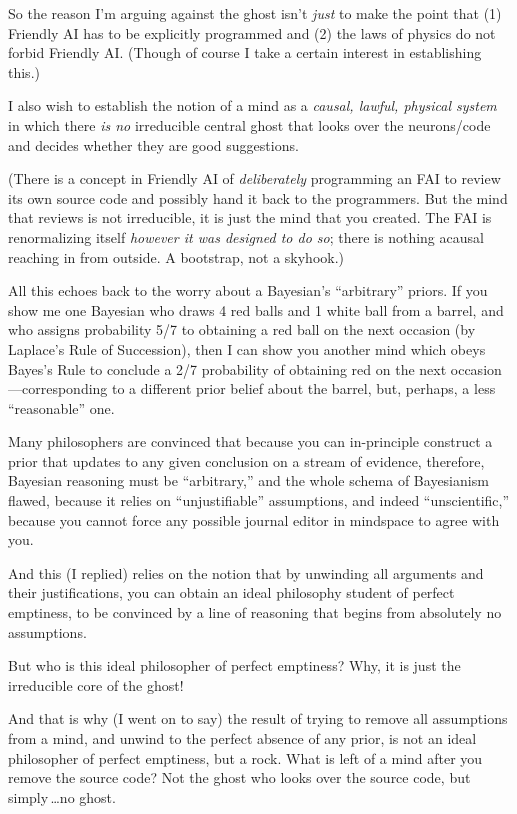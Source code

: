  So the reason I'm arguing against the ghost
isn't \textit{just} to make the point that (1) Friendly
AI has to be explicitly programmed and (2) the laws of physics do not
forbid Friendly AI. (Though of course I take a certain interest in
establishing this.)


 I also wish to establish the notion of a mind as a \textit{causal,
lawful, physical system} in which there \textit{is no} irreducible
central ghost that looks over the neurons/code and decides whether they
are good suggestions.


 (There is a concept in Friendly AI of \textit{deliberately}
programming an FAI to review its own source code and possibly hand it
back to the programmers. But the mind that reviews is not irreducible,
it is just the mind that you created. The FAI is renormalizing itself
\textit{however it was designed to do so}; there is nothing acausal
reaching in from outside. A bootstrap, not a skyhook.)


 All this echoes back to the worry about a
Bayesian's
``arbitrary'' priors. If you show me
one Bayesian who draws 4 red balls and 1 white ball from a barrel, and
who assigns probability 5/7 to obtaining a red ball on the next
occasion (by Laplace's Rule of Succession), then I can
show you another mind which obeys Bayes's Rule to
conclude a 2/7 probability of obtaining red on the next
occasion---corresponding to a different prior belief about the barrel,
but, perhaps, a less ``reasonable''
one.


 Many philosophers are convinced that because you can in-principle
construct a prior that updates to any given conclusion on a stream of
evidence, therefore, Bayesian reasoning must be
``arbitrary,'' and the whole schema
of Bayesianism flawed, because it relies on
``unjustifiable'' assumptions, and
indeed ``unscientific,'' because you
cannot force any possible journal editor in mindspace to agree with
you.


 And this (I replied) relies on the notion that by unwinding all
arguments and their justifications, you can obtain an ideal philosophy
student of perfect emptiness, to be convinced by a line of reasoning
that begins from absolutely no assumptions.


 But who is this ideal philosopher of perfect emptiness? Why, it is
just the irreducible core of the ghost!


 And that is why (I went on to say) the result of trying to remove
all assumptions from a mind, and unwind to the perfect absence of any
prior, is not an ideal philosopher of perfect emptiness, but a rock.
What is left of a mind after you remove the source code? Not the ghost
who looks over the source code, but simply\,\ldots no ghost.


